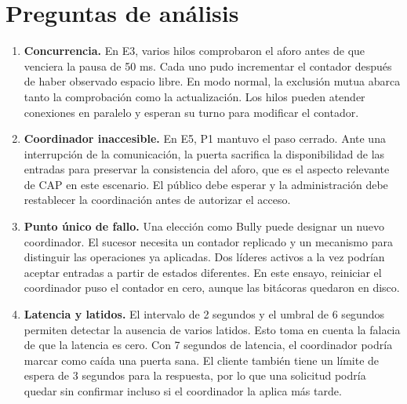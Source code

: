 \documentclass[11pt,a4paper]{article}
\begin{document}
\newpage

\section{Preguntas de análisis}
\begin{enumerate}
\item \textbf{Concurrencia.} En E3, varios hilos comprobaron el aforo antes
de que venciera la pausa de 50 ms. Cada uno pudo incrementar el contador
después de haber observado espacio libre. En modo normal, la exclusión
mutua abarca tanto la comprobación como la actualización. Los hilos
pueden atender conexiones en paralelo y esperan su turno para modificar
el contador.

\item \textbf{Coordinador inaccesible.} En E5, P1 mantuvo el paso cerrado.
Ante una interrupción de la comunicación, la puerta sacrifica la
disponibilidad de las entradas para preservar la consistencia del aforo,
que es el aspecto relevante de CAP en este escenario. El público debe
esperar y la administración debe restablecer la coordinación antes de
autorizar el acceso.

\item \textbf{Punto único de fallo.} Una elección como Bully puede designar
un nuevo coordinador. El sucesor necesita un contador replicado y un
mecanismo para distinguir las operaciones ya aplicadas. Dos líderes
activos a la vez podrían aceptar entradas a partir de estados
diferentes. En este ensayo, reiniciar el coordinador puso el contador
en cero, aunque las bitácoras quedaron en disco.

\item \textbf{Latencia y latidos.} El intervalo de 2 segundos y el umbral
de 6 segundos permiten detectar la ausencia de varios latidos. Esto
toma en cuenta la falacia de que la latencia es cero. Con 7 segundos
de latencia, el coordinador podría marcar como caída una puerta sana.
El cliente también tiene un límite de espera de 3 segundos para la
respuesta, por lo que una solicitud podría quedar sin confirmar incluso
si el coordinador la aplica más tarde.
\end{enumerate}
\end{document}

